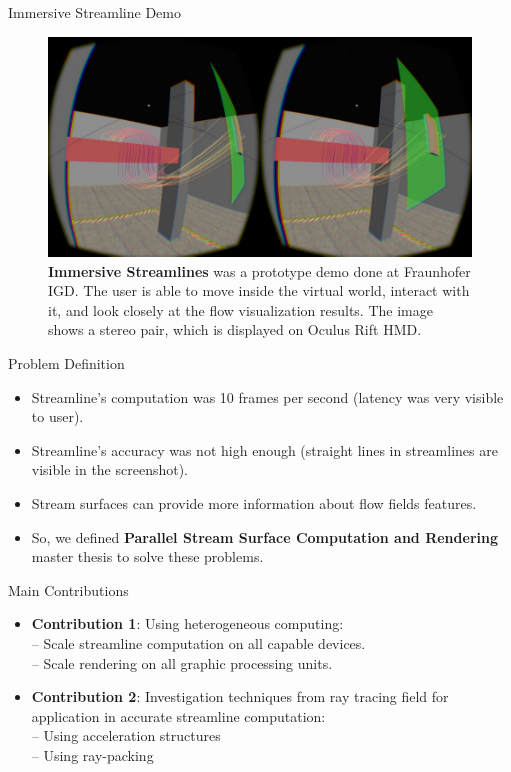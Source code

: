 \documentclass{beamer}
\begin{document}
\begin{frame}{Immersive Streamline Demo}

	\begin{figure}[ht!]
	\centering
	\includegraphics[width=0.9\linewidth]{./figures/vr.png}
	\caption{\textbf{Immersive Streamlines} was a prototype demo done at Fraunhofer IGD. The user is able to move inside the virtual world, interact with it, and look closely at the flow visualization results. The image shows a stereo pair, which is displayed on Oculus Rift HMD. }
	\label{fig:vr_irpv}
	
	\end{figure}
\end{frame}

\begin{frame}{Problem Definition}
	\begin{itemize}
		\item Streamline's computation was 10 frames per second (latency was very visible to user).
		\item Streamline's accuracy was not high enough (straight lines in streamlines are visible in the screenshot).
		\item Stream surfaces can provide more information about flow fields features.
		\item So, we defined \textbf{Parallel Stream Surface Computation and Rendering} master thesis to solve these problems.		
	\end{itemize}
\end{frame}

\begin{frame}{Main Contributions}
	\begin{itemize}
		\item \textbf{Contribution 1}: Using heterogeneous computing:\\
  		  -- Scale streamline computation on all capable devices.\\
		  -- Scale rendering on all graphic processing units.\\
		\item \textbf{Contribution 2}: Investigation techniques from ray tracing field for application in accurate streamline computation:\\
		  -- Using acceleration structures\\
		  -- Using ray-packing\\
	\end{itemize}
\end{frame}
\end{document}
